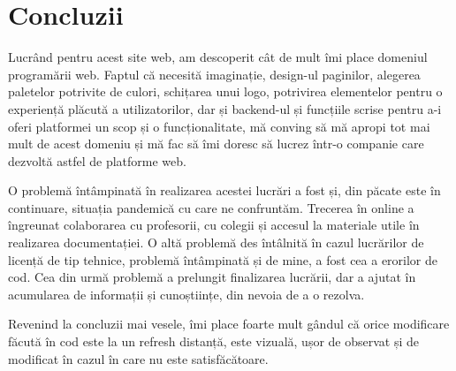 \documentclass[12pt,a4paper]{report}
\begin{document}
\section{Concluzii}
\par
Lucrând pentru acest site web, am descoperit cât de mult îmi place domeniul programării web. Faptul că necesită imaginație, design-ul paginilor, alegerea paletelor potrivite de culori, schițarea unui logo, potrivirea elementelor pentru o experiență plăcută a utilizatorilor, dar și backend-ul și funcțiile scrise pentru a-i oferi platformei un scop și o funcționalitate, mă conving să mă apropi tot mai mult de acest domeniu și mă fac să îmi doresc să lucrez într-o companie care dezvoltă astfel de platforme web. 
\\ \par
O problemă întâmpinată în realizarea acestei lucrări a fost și, din păcate este în continuare, situația pandemică cu care ne confruntăm. Trecerea în online a îngreunat colaborarea cu profesorii, cu colegii și accesul la materiale utile în realizarea documentației. O altă problemă des întâlnită în cazul lucrărilor de licență de tip tehnice, problemă întâmpinată și de mine, a fost cea a erorilor de cod. Cea din urmă problemă a prelungit finalizarea lucrării, dar a ajutat în acumularea de informații și cunoștiințe, din nevoia de a o rezolva.
\\ \par
Revenind la concluzii mai vesele, îmi place foarte mult gândul că orice modificare făcută în cod este la un refresh distanță, este vizuală, ușor de observat și de modificat în cazul în care nu este satisfăcătoare.

\newpage
\end{document}
